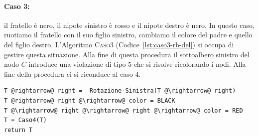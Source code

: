 \paragraph{Caso 3:} il fratello è nero, il nipote sinistro è rosso e il nipote destro è nero. In questo caso, ruotiamo il fratello con il suo figlio sinistro, cambiamo il colore del padre e quello del figlio destro. L'Algoritmo \textsc{Caso3} (Codice~\ref{lst:caso3-rb-del}) si occupa di gestire questa situazione. Alla fine di questa procedura il sottoalbero sinistro del nodo $C$ introduce una violazione di tipo 5 che si risolve ricolorando i nodi. Alla fine della procedura ci si riconduce al caso 4.
\begin{lstlisting}[language=asd,caption={Caso3(T)},label=lst:caso3-rb-del]
T @rightarrow@ right =  Rotazione-Sinistra(T @\rightarrow@ right)
T @rightarrow@ right @\rightarrow@ color = BLACK
T @\rightarrow@ right @\rightarrow@ right @\rightarrow@ color = RED
T = Caso4(T)
return T
\end{lstlisting}
